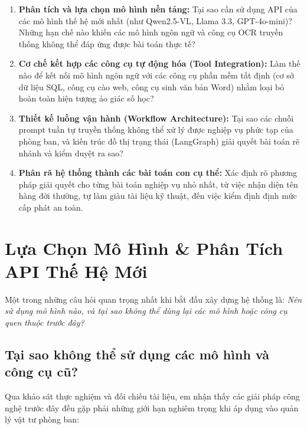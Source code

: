 \documentclass[11pt,a4paper]{article}
\begin{document}
\begin{enumerate}
    \item \textbf{Phân tích và lựa chọn mô hình nền tảng:} Tại sao cần sử dụng API của các mô hình thế hệ mới nhất (như Qwen2.5-VL, Llama 3.3, GPT-4o-mini)? Những hạn chế nào khiến các mô hình ngôn ngữ và công cụ OCR truyền thống không thể đáp ứng được bài toán thực tế?
    \item \textbf{Cơ chế kết hợp các công cụ tự động hóa (Tool Integration):} Làm thế nào để kết nối mô hình ngôn ngữ với các công cụ phần mềm tất định (cơ sở dữ liệu SQL, công cụ cào web, công cụ sinh văn bản Word) nhằm loại bỏ hoàn toàn hiện tượng ảo giác số học?
    \item \textbf{Thiết kế luồng vận hành (Workflow Architecture):} Tại sao các chuỗi prompt tuần tự truyền thống không thể xử lý được nghiệp vụ phức tạp của phòng ban, và kiến trúc đồ thị trạng thái (LangGraph) giải quyết bài toán rẽ nhánh và kiểm duyệt ra sao?
    \item \textbf{Phân rã hệ thống thành các bài toán con cụ thể:} Xác định rõ phương pháp giải quyết cho từng bài toán nghiệp vụ nhỏ nhất, từ việc nhận diện tên hàng đời thường, tự làm giàu tài liệu kỹ thuật, đến việc kiểm định định mức cấp phát an toàn.
\end{enumerate}

\vspace{0.3cm}

\section{Lựa Chọn Mô Hình \& Phân Tích API Thế Hệ Mới}

Một trong những câu hỏi quan trọng nhất khi bắt đầu xây dựng hệ thống là: \textit{Nên sử dụng mô hình nào, và tại sao không thể dùng lại các mô hình hoặc công cụ quen thuộc trước đây?}

\subsection{Tại sao không thể sử dụng các mô hình và công cụ cũ?}
Qua khảo sát thực nghiệm và đối chiếu tài liệu, em nhận thấy các giải pháp công nghệ trước đây đều gặp phải những giới hạn nghiêm trọng khi áp dụng vào quản lý vật tư phòng ban:
\end{document}
